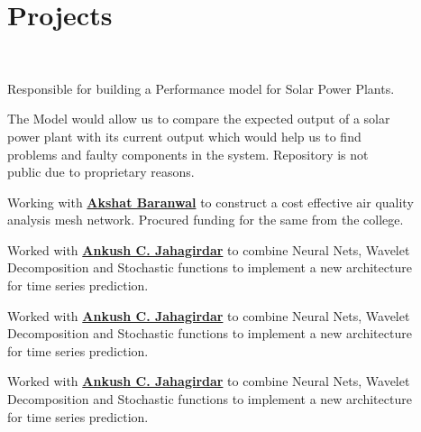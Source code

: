 \documentclass[]{limos-resume-openfont}
\begin{document}
\begin{minipage}[t]{0.66\textwidth}
\section{Projects}

\\
\begin{tightemize}
\item Responsible for building a Performance model for Solar Power Plants.
\item The Model would allow us to compare the expected output of a solar\\
power plant with its current output which would help us to find\\
problems and faulty components in the system. Repository is not\\
public due to proprietary reasons.
\end{tightemize}
\sectionsep

Working with \textbf{\href{https://www.linkedin.com/in/akshat-baranwal-9b99a112a/}{Akshat Baranwal}} to construct a cost effective air quality \\analysis mesh network. Procured funding for the same from the college.
\sectionsep

Worked with \textbf{\href{https://www.bits-pilani.ac.in/pilani/ankushchandrakant/profile}{Ankush C. Jahagirdar}} to combine Neural Nets, Wavelet Decomposition and Stochastic functions to implement a new architecture \\for time series prediction.
\sectionsep

Worked with \textbf{\href{https://www.bits-pilani.ac.in/pilani/ankushchandrakant/profile}{Ankush C. Jahagirdar}} to combine Neural Nets, Wavelet Decomposition and Stochastic functions to implement a new architecture \\for time series prediction.
\sectionsep

Worked with \textbf{\href{https://www.bits-pilani.ac.in/pilani/ankushchandrakant/profile}{Ankush C. Jahagirdar}} to combine Neural Nets, Wavelet Decomposition and Stochastic functions to implement a new architecture \\for time series prediction.
\sectionsep


\end{minipage}
\end{document}
